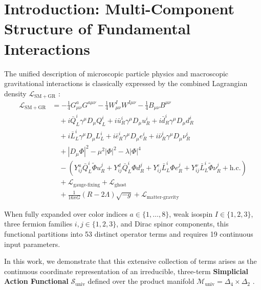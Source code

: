 \documentclass[11pt,reqno]{amsart}
\theoremstyle{definition}
\begin{document}
\section{Introduction: Multi-Component Structure of Fundamental Interactions}

The unified description of microscopic particle physics and macroscopic gravitational interactions is classically expressed by the combined Lagrangian density $\mathcal{L}_{\mathrm{SM+GR}}$ \cite{weinberg1967model,weinberg1989cosmological,pdg2024}:
\begin{align}
\mathcal{L}_{\mathrm{SM+GR}} &= -\frac{1}{4} G_{\mu\nu}^a G^{a\mu\nu} - \frac{1}{4} W_{\mu\nu}^I W^{I\mu\nu} - \frac{1}{4} B_{\mu\nu} B^{\mu\nu} \tag{Gauge Field Kinetic}\\
&\quad + i \bar{Q}_L^i \gamma^\mu D_\mu Q_L^i + i \bar{u}_R^i \gamma^\mu D_\mu u_R^i + i \bar{d}_R^i \gamma^\mu D_\mu d_R^i \tag{Quark Chiral Kinetic}\\
&\quad + i \bar{L}_L^i \gamma^\mu D_\mu L_L^i + i \bar{e}_R^i \gamma^\mu D_\mu e_R^i + i \bar{\nu}_R^i \gamma^\mu D_\mu \nu_R^i \tag{Lepton Chiral Kinetic}\\
&\quad + |D_\mu \Phi|^2 - \mu^2 |\Phi|^2 - \lambda |\Phi|^4 \tag{Scalar Higgs Potential}\\
&\quad - \left( Y_{ij}^u \bar{Q}_L^i \widetilde{\Phi} u_R^j + Y_{ij}^d \bar{Q}_L^i \Phi d_R^j + Y_{ij}^e \bar{L}_L^i \Phi e_R^j + Y_{ij}^\nu \bar{L}_L^i \widetilde{\Phi} \nu_R^j + \mathrm{h.c.} \right) \tag{Chiral Yukawa Sector}\\
&\quad + \mathcal{L}_{\mathrm{gauge\text{-}fixing}} + \mathcal{L}_{\mathrm{ghost}} \tag{Faddeev--Popov Sector}\\
&\quad + \frac{1}{16\pi G} (R - 2\Lambda) \sqrt{-g} + \mathcal{L}_{\mathrm{matter}\text{-}\mathrm{gravity}} \tag{Einstein--Hilbert Spacetime}
\end{align}

When fully expanded over color indices $a \in \{1,\dots,8\}$, weak isospin $I \in \{1,2,3\}$, three fermion families $i, j \in \{1,2,3\}$, and Dirac spinor components, this functional partitions into 53 distinct operator terms and requires 19 continuous input parameters.

In this work, we demonstrate that this extensive collection of terms arises as the continuous coordinate representation of an irreducible, three-term \textbf{Simplicial Action Functional} $\mathcal{S}_{\mathrm{univ}}$ defined over the product manifold $\mathcal{M}_{\mathrm{univ}} = \Delta_4 \times \Delta_2$ \cite{silvafilho2026book}.
\end{document}
